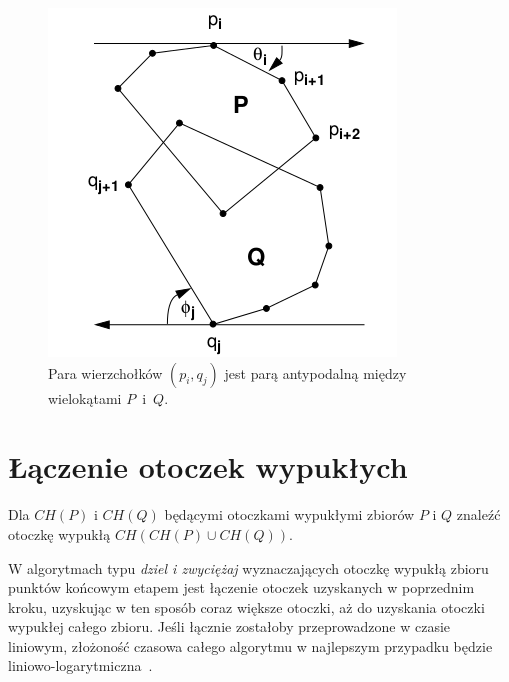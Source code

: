 \begin{figure}[htb]
  \centering
  \includegraphics[scale=0.5]{img/calipers3}
  \caption{\label{img:calipers3} Para wierzchołków $(p_i, q_j)$ jest
    parą antypodalną między wielokątami $P$~i~$Q$.}
\end{figure}

\section{Łączenie otoczek wypukłych}
\begin{problem}
  Dla $CH(P)$ i $CH(Q)$ będącymi otoczkami wypukłymi zbiorów $P$ i
  $Q$ znaleźć otoczkę wypukłą $CH(CH(P) \cup CH(Q))$.
\end{problem}

W algorytmach typu \emph{dziel i zwyciężaj} wyznaczających otoczkę
wypukłą zbioru punktów końcowym etapem jest łączenie otoczek
uzyskanych w poprzednim kroku, uzyskując w ten sposób coraz większe
otoczki, aż do uzyskania otoczki wypukłej całego zbioru. Jeśli łącznie
zostałoby przeprowadzone w czasie liniowym, złożoność czasowa całego
algorytmu w najlepszym przypadku będzie
liniowo-logarytmiczna~\cite{Graham72}.

